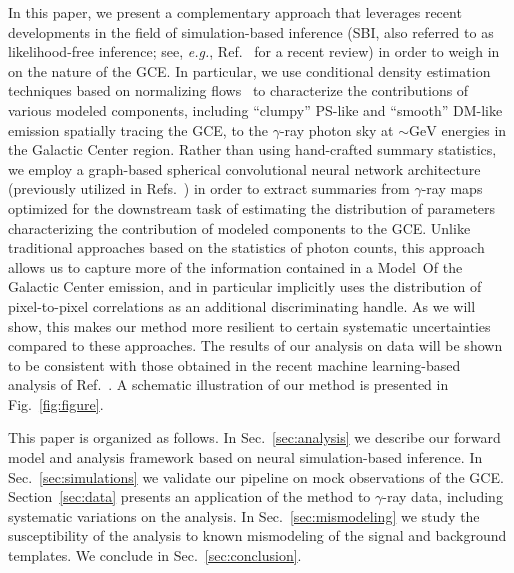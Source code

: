\documentclass[prd,aps,10pt,nofootinbib,twocolumn,superscriptaddress,preprintnumbers,balancelastpage,longbibliography,floatfix]{revtex4-2}
\begin{document}
In this paper, we present a complementary approach that leverages recent developments in the field of simulation-based inference (SBI, also referred to as likelihood-free inference; see, \emph{e.g.}, Ref.~\cite{Cranmer:2019eaq} for a recent review) in order to weigh in on the nature of the GCE. In particular, we use conditional density estimation techniques based on normalizing flows~\cite{papamakarios2019normalizing,DBLP:conf/icml/RezendeM15} to characterize the contributions of various modeled components, including ``clumpy'' PS-like and ``smooth'' DM-like emission spatially tracing the GCE, to the $\gamma$-ray photon sky at $\sim\mathrm{GeV}$ energies in the Galactic Center region. Rather than using hand-crafted summary statistics, we employ a graph-based spherical convolutional neural network architecture (previously utilized in Refs.~\cite{List:2020mzd,List:2021aer}) in order to extract summaries from $\gamma$-ray maps optimized for the downstream task of estimating the distribution of parameters characterizing the contribution of modeled components to the GCE. Unlike traditional approaches based on the statistics of photon counts, this approach allows us to capture more of the information contained in a {Model~O}f the Galactic Center emission, and in particular implicitly uses the distribution of pixel-to-pixel correlations as an additional discriminating handle. As we will show, this makes our method more resilient to certain systematic uncertainties compared to these approaches. The results of our analysis on \Fermi data will be shown to be consistent with those obtained in the recent machine learning-based analysis of Ref.~\cite{List:2021aer}. A schematic illustration of our method is presented in Fig.~\ref{fig:figure}.

This paper is organized as follows. In Sec.~\ref{sec:analysis} we describe our forward model and analysis framework based on neural simulation-based inference. In Sec.~\ref{sec:simulations} we validate our pipeline on mock observations of the \Fermi GCE. Section~\ref{sec:data} presents an application of the method to \Fermi $\gamma$-ray data, including systematic variations on the analysis. In Sec.~\ref{sec:mismodeling} we study the susceptibility of the analysis to known mismodeling of the signal and background templates. We conclude in Sec.~\ref{sec:conclusion}.
\end{document}
